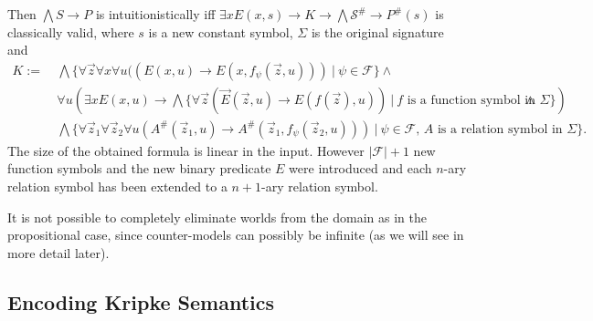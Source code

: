 \documentclass[runningheads]{llncs}
\begin{document}
\begin{theorem}
\begin{itemize}
	\end{itemize}
	Then $\bigwedge S\to P$ is intuitionistically iff $\exists xE(x, s)\to K\to \bigwedge\mathcal S^\#\to P^\#(s)$ is classically valid, where $s$ is a new constant symbol, $\Sigma$ is the original signature and
	\begin{align*}
		K := &\:\bigwedge\{\forall\vec z\forall x\forall u((E(x, u)\to E(x, f_\psi(\vec z, u)))\:|\:\psi\in\mathcal F\}\wedge\\
		&\:\forall u\left(\exists xE(x, u)\to \bigwedge\{\forall\vec z(\vec E(\vec z, u)\to E(f(\vec z), u))\:|\:\text{$f$ is a function symbol in $\Sigma$}\}\right)\wedge\\
		&\:\bigwedge\{\forall\vec z_1\forall \vec z_2\forall u(A^\#(\vec z_1, u)\to A^\#(\vec z_1, f_\psi(\vec z_2, u)))\:|\:\text{$\psi\in\mathcal F$, $A$ is a relation symbol in $\Sigma$}\}.
	\end{align*}
	The size of the obtained formula is linear in the input. However $|\mathcal F| + 1$ new function symbols and the new binary predicate $E$ were introduced and each $n$-ary relation symbol has been extended to a $n+1$-ary relation symbol.
\end{theorem}

It is not possible to completely eliminate worlds from the domain as in the propositional case, since counter-models can possibly be infinite (as we will see in more detail later).

\subsection{Encoding Kripke Semantics}
\end{document}
